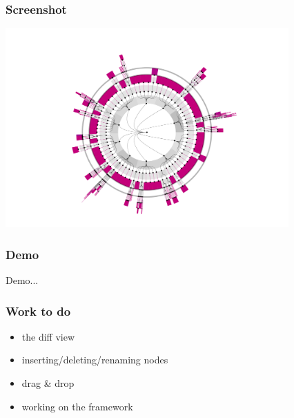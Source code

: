 \documentclass{beamer}
\begin{document}
\begin{frame}
\frametitle{Screenshot}
\includegraphics[height=3.0in]{images/101231_010038.pdf}
\end{frame}

\begin{frame}
\frametitle{Demo}
Demo...
\end{frame}

\begin{frame}
\frametitle{Work to do}
\begin{itemize}
\item the diff view
\item inserting/deleting/renaming nodes
\item drag \& drop
\item working on the framework
\end{itemize}
\end{frame}
\end{document}
